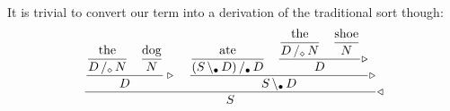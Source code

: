 \documentclass{amsart}
\begin{document}
It is trivial to convert our term into a derivation of the traditional
sort though:
\[
  \dfrac{
    \dfrac{
      \dfrac{\text{the}}{\rarrty D|[\con\diamond]N}
      \quad
      \dfrac{\text{dog}}{N}
    }{D}\triangleright
    \quad
    \dfrac{
      \dfrac{\text{ate}}{\rarrty {(\larrty S|[\con\bullet]D)}|[\con\bullet]D}
      \quad
      \dfrac{
        \dfrac{\text{the}}{\rarrty D|[\con\diamond]N}
        \quad
        \dfrac{\text{shoe}}{N}
      }{D}\triangleright
    }{\larrty S|[\con\bullet]D}\triangleright
  }{S}\triangleleft
\]
\end{document}
